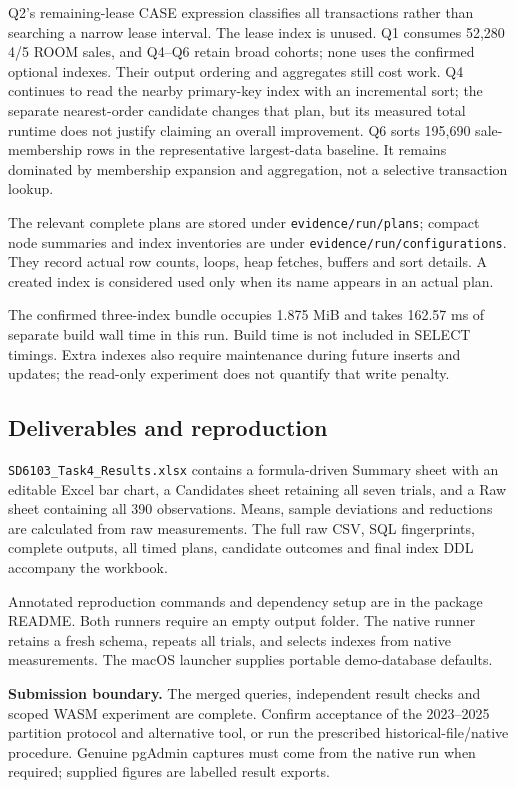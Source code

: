 \documentclass[11pt,a4paper]{article}
\begin{document}
Q2's remaining-lease CASE expression classifies all transactions rather than searching a narrow lease interval. The lease index is unused. Q1 consumes 52,280 4/5 ROOM sales, and Q4--Q6 retain broad cohorts; none uses the confirmed optional indexes. Their output ordering and aggregates still cost work. Q4 continues to read the nearby primary-key index with an incremental sort; the separate nearest-order candidate changes that plan, but its measured total runtime does not justify claiming an overall improvement. Q6 sorts 195,690 sale-membership rows in the representative largest-data baseline. It remains dominated by membership expansion and aggregation, not a selective transaction lookup.

The relevant complete plans are stored under \texttt{evidence/run/plans}; compact node summaries and index inventories are under \texttt{evidence/run/configurations}. They record actual row counts, loops, heap fetches, buffers and sort details. A created index is considered used only when its name appears in an actual plan.

The confirmed three-index bundle occupies 1.875 MiB and takes 162.57 ms of separate build wall time in this run. Build time is not included in SELECT timings. Extra indexes also require maintenance during future inserts and updates; the read-only experiment does not quantify that write penalty.

\subsection{Deliverables and reproduction}
\texttt{SD6103\_Task4\_Results.xlsx} contains a formula-driven Summary sheet with an editable Excel bar chart, a Candidates sheet retaining all seven trials, and a Raw sheet containing all 390 observations. Means, sample deviations and reductions are calculated from raw measurements. The full raw CSV, SQL fingerprints, complete outputs, all timed plans, candidate outcomes and final index DDL accompany the workbook.

Annotated reproduction commands and dependency setup are in the package README. Both runners require an empty output folder. The native runner retains a fresh schema, repeats all trials, and selects indexes from native measurements. The macOS launcher supplies portable demo-database defaults.

\textbf{Submission boundary.} The merged queries, independent result checks and scoped WASM experiment are complete. Confirm acceptance of the 2023--2025 partition protocol and alternative tool, or run the prescribed historical-file/native procedure. Genuine pgAdmin captures must come from the native run when required; supplied figures are labelled result exports.
\end{document}
